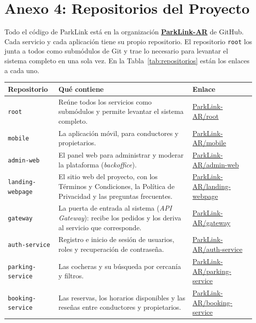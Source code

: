 \newpage
\section{Anexo 4: Repositorios del Proyecto}\label{anexo:repositorios}

Todo el código de ParkLink está en la organización \href{https://github.com/ParkLink-AR}{\textbf{ParkLink-AR}} de GitHub. Cada servicio y cada aplicación tiene su propio repositorio. El repositorio \texttt{root} los junta a todos como submódulos de Git y trae lo necesario para levantar el sistema completo en una sola vez. En la Tabla~\ref{tab:repositorios} están los enlaces a cada uno.

\begin{table}[H]
\centering
\renewcommand{\arraystretch}{1.3}
\begin{tabularx}{\textwidth}{@{}l X l@{}}
\toprule
\textbf{Repositorio} & \textbf{Qué contiene} & \textbf{Enlace} \\
\midrule
\texttt{root} & Reúne todos los servicios como submódulos y permite levantar el sistema completo. & \href{https://github.com/ParkLink-AR/root}{ParkLink-AR/root} \\
\texttt{mobile} & La aplicación móvil, para conductores y propietarios. & \href{https://github.com/ParkLink-AR/mobile}{ParkLink-AR/mobile} \\
\texttt{admin-web} & El panel web para administrar y moderar la plataforma (\textit{backoffice}). & \href{https://github.com/ParkLink-AR/admin-web}{ParkLink-AR/admin-web} \\
\texttt{landing-webpage} & El sitio web del proyecto, con los Términos y Condiciones, la Política de Privacidad y las preguntas frecuentes. & \href{https://github.com/ParkLink-AR/landing-webpage}{ParkLink-AR/landing-webpage} \\
\texttt{gateway} & La puerta de entrada al sistema (\textit{API Gateway}): recibe los pedidos y los deriva al servicio que corresponde. & \href{https://github.com/ParkLink-AR/gateway}{ParkLink-AR/gateway} \\
\texttt{auth-service} & Registro e inicio de sesión de usuarios, roles y recuperación de contraseña. & \href{https://github.com/ParkLink-AR/auth-service}{ParkLink-AR/auth-service} \\
\texttt{parking-service} & Las cocheras y su búsqueda por cercanía y filtros. & \href{https://github.com/ParkLink-AR/parking-service}{ParkLink-AR/parking-service} \\
\texttt{booking-service} & Las reservas, los horarios disponibles y las reseñas entre conductores y propietarios. & \href{https://github.com/ParkLink-AR/booking-service}{ParkLink-AR/booking-service} \\

\end{tabularx}
\end{table}
